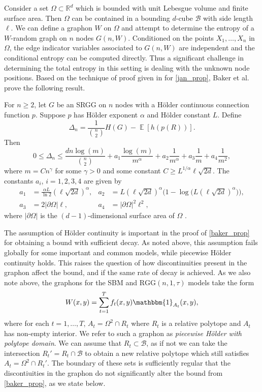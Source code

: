 \documentclass{svproc}
\DeclareMathOperator{\E}{\mathbb{E}}
\newcommand{\1}{\mathbbm{1}}
\newcommand{\K}{\Omega}
\newcommand{\B}{\mathcal{B}}
\newcommand{\rr}{\mathbb{R}}
\begin{document}
Consider a set $\K\subset\rr^d$ which is bounded with unit Lebesgue volume and finite surface area. Then $\K$ can be contained in a bounding $d$-cube $\B$ with side length $\ell$. We can define a graphon $W$ on $\K$ and attempt to determine the entropy of a $W$-random graph on $n$ nodes $G(n,W)$. Conditioned on the points $X_1,\dots, X_n$ in $\Omega$, the edge indicator variables associated to $G(n,W)$ are independent and the conditional entropy can be computed directly. Thus a significant challenge in determining the total entropy in this setting is dealing with the unknown node positions. Based on the technique of proof given in \cite{janson2013} for \cref{jan_prop}, Baker et al. \cite{bakerpaper} prove the following result. 
\begin{proposition}\label{baker_prop}
For $n\geq 2$, let $G$ be an SRGG on $n$ nodes with a H\"{o}lder continuous connection function $p$. Suppose $p$ has H\"{o}lder exponent $\alpha$ and H\"{o}lder constant $L$. Define
\[\Delta_n = \frac{1}{\binom{n}{2}}H(G)-\E[h(p(R))].\]
Then
\[0\leq\Delta_n\leq\frac{dn\log(m)}{\binom{n}{2}}+a_1\frac{\log(m)}{m^\alpha}+a_2\frac{1}{m^\alpha}+a_3\frac{1}{m}+a_4\frac{1}{m^2},\]
where $m = Cn^\gamma$ for some $\gamma>0$ and some constant $C \geq L^{1/\alpha}\ell\sqrt{2d}$. The constants $a_i$, $i=1,2,3,4$ are given by
\begin{align*}
a_1 &= \frac{\alpha L}{\ln 2}(\ell\sqrt{2d})^\alpha, & a_2 &= L(\ell\sqrt{2d})^\alpha \big(1-\log\big(L(\ell\sqrt{2d})^\alpha\big)\big),\\
a_3&= 2|\partial\K|\ell, & a_4 &= |\partial\K|^2\ell^2,
\end{align*}
where $|\partial\K|$ is the $(d-1)$-dimensional surface area of $\K$ . 
\end{proposition}

The assumption of H\"{o}lder continuity is important in the proof of \cref{baker_prop} for obtaining a bound with sufficient decay. As noted above, this assumption fails globally for some important and common models, while piecewise H\"{o}lder continuity holds. This raises the question of how discontinuities present in the graphon affect the bound, and if the same rate of decay is achieved.
As we also note above, the graphons for the SBM and $\mathrm{RGG}(n,1,\tau)$ models take the form
\begin{equation}W(x,y) = \sum_{t=1}^T f_t(x,y) \1_{A_t}(x,y),\end{equation}
where for each $t=1,\dots,T$, $A_t = \K^2\cap R_t$ where $R_t$ is a relative polytope and $A_t$ has non-empty interior. We refer to such a graphon as \emph{piecewise H\"{o}lder with polytope domain}. We can assume that $R_t\subset\B$, as if not we can take the intersection $R_t'=R_t\cap\B$ to obtain a new relative polytope which still satisfies $A_t = \K^2\cap R_t'$. The boundary of these sets is sufficiently regular that the discontiuities in the graphon do not significantly alter the bound from \cref{baker_prop}, as we state below.
\end{document}
